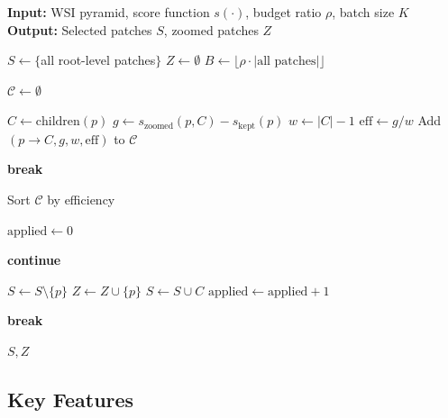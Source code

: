\documentclass[11pt]{article}
\begin{document}
\begin{algorithm}
\caption{HUMBE (Hierarchical Utility-Maximizing Budget Enforcer)}
\begin{algorithmic}[1]
\State \textbf{Input:} WSI pyramid, score function $s(\cdot)$, budget ratio $\rho$, batch size $K$
\State \textbf{Output:} Selected patches $S$, zoomed patches $Z$

\State $S \gets \{$all root-level patches$\}$
\State $Z \gets \emptyset$
\State $B \gets \lfloor \rho \cdot |\text{all patches}| \rfloor$

    \State $\mathcal{C} \gets \emptyset$ 
    
        \State $C \gets \text{children}(p)$
            \State $g \gets s_{\text{zoomed}}(p, C) - s_{\text{kept}}(p)$
            \State $w \gets |C| - 1$
                \State $\text{eff} \gets g / w$
                \State Add $(p \to C, g, w, \text{eff})$ to $\mathcal{C}$
            \EndIf
        \EndIf
    \EndFor
    
        \State \textbf{break} 
    \EndIf
    
    \State Sort $\mathcal{C}$ by efficiency 
    
    \State $\text{applied} \gets 0$ 
    
            \State \textbf{continue}
        \EndIf
        
        \State $S \gets S \setminus \{p\}$ 
        \State $Z \gets Z \cup \{p\}$ 
        \State $S \gets S \cup C$ 
        \State $\text{applied} \gets \text{applied} + 1$
    \EndFor
    
        \State \textbf{break} 
    \EndIf
\EndWhile

\State \Return $S, Z$ 
\end{algorithmic}
\end{algorithm}

\subsection{Key Features}
\end{document}

